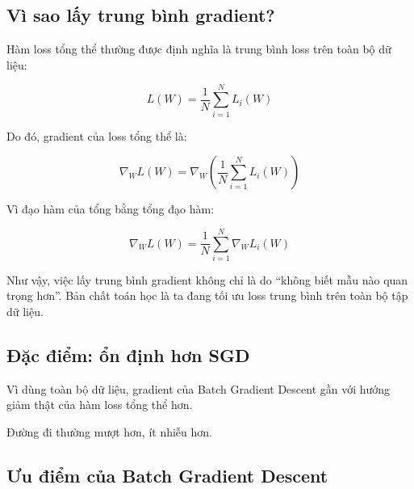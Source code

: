 \subsection{Vì sao lấy trung bình gradient?}

Hàm loss tổng thể thường được định nghĩa là trung bình loss trên toàn bộ dữ liệu:

\[
    L(W)=\frac{1}{N}\sum_{i=1}^{N}L_i(W)
\]

Do đó, gradient của loss tổng thể là:

\[
    \nabla_W L(W)
    =
    \nabla_W
    \left(
    \frac{1}{N}
    \sum_{i=1}^{N}L_i(W)
    \right)
\]

Vì đạo hàm của tổng bằng tổng đạo hàm:

\[
    \nabla_W L(W)
    =
    \frac{1}{N}
    \sum_{i=1}^{N}
    \nabla_W L_i(W)
\]

Như vậy, việc lấy trung bình gradient không chỉ là do ``không biết mẫu nào quan trọng hơn''. Bản chất toán học là ta đang tối ưu loss trung bình trên toàn bộ tập dữ liệu.

\subsection{Đặc điểm: ổn định hơn SGD}

Vì dùng toàn bộ dữ liệu, gradient của Batch Gradient Descent gần với hướng giảm thật của hàm loss tổng thể hơn.

Đường đi thường mượt hơn, ít nhiễu hơn.

\begin{center}
\end{center}

\subsection{Ưu điểm của Batch Gradient Descent}

